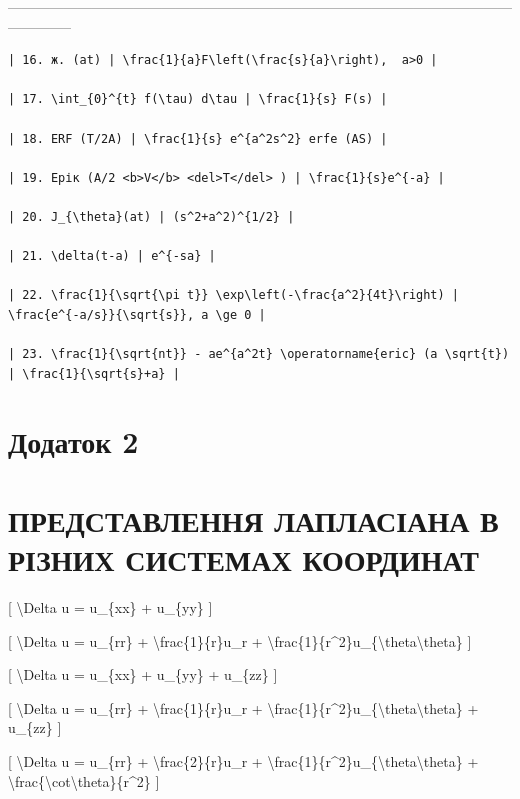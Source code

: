 \documentclass[
]{article}
\begin{document}
\textbar------------------------------------------------------------------------\textbar--------------------------------------------------\textbar{}

\begin{verbatim}
| 16. ж. (at) | \frac{1}{a}F\left(\frac{s}{a}\right),  a>0 |

| 17. \int_{0}^{t} f(\tau) d\tau | \frac{1}{s} F(s) |

| 18. ERF (T/2A) | \frac{1}{s} e^{a^2s^2} erfe (AS) |

| 19. Ерік (A/2 <b>V</b> <del>T</del> ) | \frac{1}{s}e^{-a} |

| 20. J_{\theta}(at) | (s^2+a^2)^{1/2} |

| 21. \delta(t-a) | e^{-sa} |

| 22. \frac{1}{\sqrt{\pi t}} \exp\left(-\frac{a^2}{4t}\right) | \frac{e^{-a/s}}{\sqrt{s}}, a \ge 0 |

| 23. \frac{1}{\sqrt{nt}} - ae^{a^2t} \operatorname{eric} (a \sqrt{t}) | \frac{1}{\sqrt{s}+a} |
\end{verbatim}

\section{Додаток 2}\label{ux434ux43eux434ux430ux442ux43eux43a-2}

\section{ПРЕДСТАВЛЕННЯ ЛАПЛАСІАНА В РІЗНИХ СИСТЕМАХ
КООРДИНАТ}\label{ux43fux440ux435ux434ux441ux442ux430ux432ux43bux435ux43dux43dux44f-ux43bux430ux43fux43bux430ux441ux456ux430ux43dux430-ux432-ux440ux456ux437ux43dux438ux445-ux441ux438ux441ux442ux435ux43cux430ux445-ux43aux43eux43eux440ux434ux438ux43dux430ux442}

{[} \textbackslash Delta u = u\_\{xx\} + u\_\{yy\} {]}

{[} \textbackslash Delta u = u\_\{rr\} +
\textbackslash frac\{1\}\{r\}u\_r +
\textbackslash frac\{1\}\{r\^{}2\}u\_\{\textbackslash theta\textbackslash theta\}
{]}

{[} \textbackslash Delta u = u\_\{xx\} + u\_\{yy\} + u\_\{zz\} {]}

{[} \textbackslash Delta u = u\_\{rr\} +
\textbackslash frac\{1\}\{r\}u\_r +
\textbackslash frac\{1\}\{r\^{}2\}u\_\{\textbackslash theta\textbackslash theta\}
+ u\_\{zz\} {]}

{[} \textbackslash Delta u = u\_\{rr\} +
\textbackslash frac\{2\}\{r\}u\_r +
\textbackslash frac\{1\}\{r\^{}2\}u\_\{\textbackslash theta\textbackslash theta\}
+
\textbackslash frac\{\textbackslash cot\textbackslash theta\}\{r\^{}2\}
{]}
\end{document}
